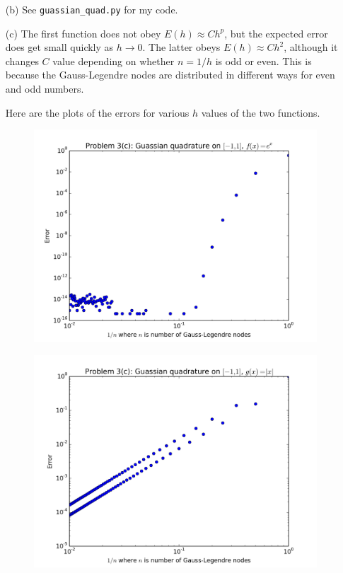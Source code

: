 \documentclass[10pt]{article}
\begin{document}
\begin{itemize}
\item[(b)] See \verb+guassian_quad.py+ for my code.

\item[(c)] The first function does not obey $ E(h) \approx Ch^p $, but the expected error does get small quickly as $ h \to 0 $. The latter obeys $ E(h) \approx C h^2 $, although it changes $C$ value depending on whether $n = 1/h$ is odd or even. This is because the Gauss-Legendre nodes are distributed in different ways for even and odd numbers.

Here are the plots of the errors for various $h$ values of the two functions.

\begin{figure}[H]
  \centering
    \includegraphics[scale=0.6]{gauss0}
\end{figure}

\begin{figure}[H]
  \centering
    \includegraphics[scale=0.6]{gauss1}
\end{figure}
\end{itemize}
\end{document}
